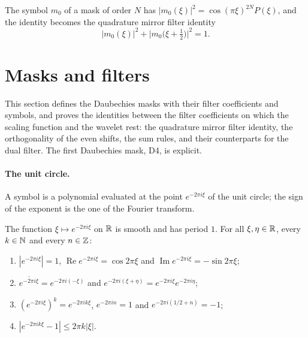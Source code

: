 The symbol $m_0$ of a mask of order $N$ has $|m_0(\xi)|^2 = \cos(\pi\xi)^{2N} P(\xi)$, and the
identity becomes the quadrature mirror filter identity
\[
  |m_0(\xi)|^2 + \bigl|m_0\bigl(\xi + \tfrac12\bigr)\bigr|^2 = 1 .
\]

\section{Masks and filters}

This section defines the Daubechies masks with their filter coefficients and symbols, and proves
the identities between the filter coefficients on which the scaling function and the wavelet
rest: the quadrature mirror filter identity, the orthogonality of the even shifts, the sum
rules, and their counterparts for the dual filter. The first Daubechies mask, D4, is explicit.

\paragraph{The unit circle.}
A symbol is a polynomial evaluated at the point $e^{-2\pi i \xi}$ of the unit circle; the sign
of the exponent is the one of the Fourier transform.

\begin{lemma}
\label{lem:daub-exp}
\leanok
The function $\xi \mapsto e^{-2\pi i \xi}$ on $\mathbb{R}$ is smooth and has period $1$. For all
$\xi, \eta \in \mathbb{R}$, every $k \in \mathbb{N}$ and every $n \in \mathbb{Z}$:
\begin{enumerate}
  \item $|e^{-2\pi i \xi}| = 1$, $\operatorname{Re} e^{-2\pi i \xi} = \cos 2\pi\xi$ and
    $\operatorname{Im} e^{-2\pi i \xi} = -\sin 2\pi\xi$;
  \item $\overline{e^{-2\pi i \xi}} = e^{-2\pi i (-\xi)}$ and
    $e^{-2\pi i (\xi + \eta)} = e^{-2\pi i \xi} e^{-2\pi i \eta}$;
  \item $(e^{-2\pi i \xi})^k = e^{-2\pi i k \xi}$, $e^{-2\pi i n} = 1$ and
    $e^{-2\pi i (1/2 + n)} = -1$;
  \item $|e^{-2\pi i k \xi} - 1| \leq 2\pi k |\xi|$.
\end{enumerate}
\end{lemma}

